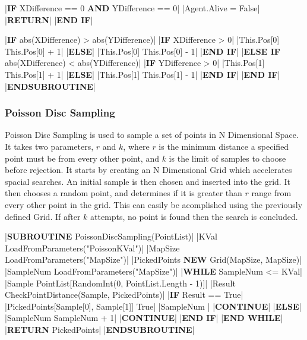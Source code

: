 \begin{flushleft}
\begin{pseudocode}
    |\textbf{IF} XDifference == 0 \textbf{AND} YDifference == 0|
        |Agent.Alive = False|
        |\textbf{RETURN}|
    |\textbf{END IF}|

    |\textbf{IF} abs(XDifference) > abs(YDifference)|
        |\textbf{IF} XDifference > 0|
            |This.Pos[0] \leftarrow This.Pos[0] + 1|
        |\textbf{ELSE}|
            |This.Pos[0] \leftarrow This.Pos[0] - 1|
        |\textbf{END IF}|
    |\textbf{ELSE IF} abs(XDifference) < abs(YDifference)|
        |\textbf{IF} YDifference > 0|
            |This.Pos[1] \leftarrow This.Pos[1] + 1|
        |\textbf{ELSE}|
            |This.Pos[1] \leftarrow This.Pos[1] - 1|
        |\textbf{END IF}|
    |\textbf{END IF}|
|\textbf{ENDSUBROUTINE}|
                \end{pseudocode}
                
                \vspace{0.5cm}
            \subsubsection{Poisson Disc Sampling}
                Poisson Disc Sampling is used to sample a set of points in N Dimensional Space. It takes two parameters, $r$ and $k$, where
                $r$ is the minimum distance a specified point must be from every other point, and $k$ is the limit of samples to choose
                before rejection. It starts by creating an N Dimensional Grid which accelerates spacial searches. An initial sample is then
                chosen and inserted into the grid. It then chooses a random point, and determines if it is greater than $r$ range from every 
                other point in the grid. This can easily be acomplished using the previously defined Grid. If after $k$ attempts, no point is
                found then the search is concluded.

                \vspace{0.2cm}
                \begin{pseudocode}
|\textbf{SUBROUTINE} PoissonDiscSampling(PointList)|
    |KVal \leftarrow LoadFromParameters("PoissonKVal")|
    |MapSize \leftarrow LoadFromParameters("MapSize")|
    |PickedPoints \leftarrow \textbf{NEW} Grid(MapSize, MapSize)|
    |SampleNum \leftarrow LoadFromParameters("MapSize")|
    |\textbf{WHILE} SampleNum <= KVal|
        |Sample \leftarrow PointList[RandomInt(0, PointList.Length - 1)]|
        |Result \leftarrow CheckPointDistance(Sample, PickedPoints)|
        |\textbf{IF} Result == True|
            |PickedPoints[Sample[0], Sample[1]] \leftarrow True|
            |SampleNum |
            |\textbf{CONTINUE}|
        |\textbf{ELSE}|
            |SampleNum \leftarrow SampleNum + 1|
            |\textbf{CONTINUE}|
        |\textbf{END IF}|
    |\textbf{END WHILE}|
    |\textbf{RETURN} PickedPoints|
|\textbf{ENDSUBROUTINE}|
                \end{pseudocode}
                

\end{flushleft}
